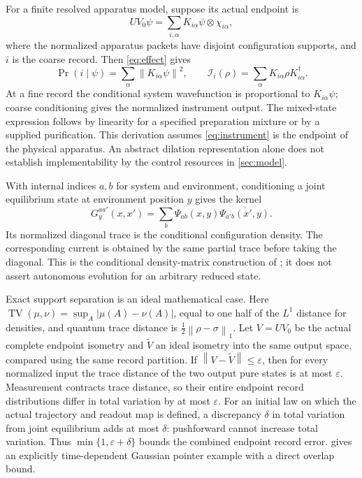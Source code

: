 \documentclass[11pt]{article}
\numberwithin{equation}{section}
\theoremstyle{definition}
\newcommand{\norm}[1]{\left\|#1\right\|}
\begin{document}
For a finite resolved apparatus model, suppose its actual endpoint is
\begin{equation}\label{eq:instrument}
 UV_0\psi=\sum_{i,\alpha}K_{i\alpha}\psi\otimes\chi_{i\alpha},
\end{equation}
where the normalized apparatus packets have disjoint configuration supports, and \(i\) is the coarse record. Then \eqref{eq:effect} gives
\[
 \Pr(i\mid\psi)=\sum_\alpha\norm{K_{i\alpha}\psi}^2,\qquad
 \mathcal I_i(\rho)=\sum_\alpha K_{i\alpha}\rho K_{i\alpha}^\dagger.
\]
At a fine record the conditional system wavefunction is proportional to \(K_{i\alpha}\psi\); coarse conditioning gives the normalized instrument output. The mixed-state expression follows by linearity for a specified preparation mixture or by a supplied purification. This derivation assumes \eqref{eq:instrument} is the endpoint of the physical apparatus. An abstract dilation representation alone does not establish implementability by the control resources in \cref{sec:model}.

With internal indices \(a,b\) for system and environment, conditioning a joint equilibrium state at environment position \(y\) gives the kernel
\[
 G_y^{aa'}(x,x')=\sum_b\Psi_{ab}(x,y)\overline{\Psi_{a'b}(x',y)}.
\]
Its normalized diagonal trace is the conditional configuration density. The corresponding current is obtained by the same partial trace before taking the diagonal. This is the conditional density-matrix construction of \cite[Section 4]{DGTZ2005}; it does not assert autonomous evolution for an arbitrary reduced state.

Exact support separation is an ideal mathematical case. Here \(\operatorname{TV}(\mu,\nu)=\sup_A|\mu(A)-\nu(A)|\), equal to one half of the \(L^1\) distance for densities, and quantum trace distance is \(\tfrac12\norm{\rho-\sigma}_1\). Let \(V=UV_0\) be the actual complete endpoint isometry and \(\widetilde V\) an ideal isometry into the same output space, compared using the same record partition. If \(\norm{V-\widetilde V}\le\varepsilon\), then for every normalized input the trace distance of the two output pure states is at most \(\varepsilon\). Measurement contracts trace distance, so their entire endpoint record distributions differ in total variation by at most \(\varepsilon\). For an initial law on which the actual trajectory and readout map is defined, a discrepancy \(\delta\) in total variation from joint equilibrium adds at most \(\delta\): pushforward cannot increase total variation. Thus \(\min\{1,\varepsilon+\delta\}\) bounds the combined endpoint record error.  gives an explicitly time-dependent Gaussian pointer example with a direct overlap bound.
\end{document}
